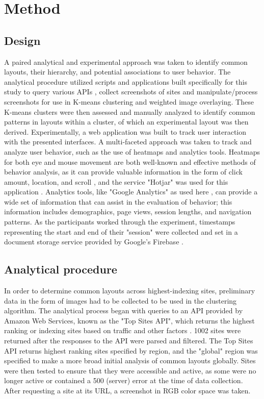 \documentclass[conference]{IEEEtran}
\begin{document}
\section{Method}

\subsection{Design}

A paired analytical and experimental approach was taken to identify common layouts, their hierarchy, and potential associations to user behavior. The analytical procedure utilized scripts and applications \cite{sorin_2020} built specifically for this study to query various APIs \cite{antoniou_2015, deepai}, collect screenshots of sites and manipulate/process screenshots for use in K-means clustering and weighted image overlaying. These K-means clusters were then assessed and manually analyzed to identify common patterns in layouts within a cluster, of which an experimental layout was then derived. Experimentally, a web application was built \cite{sorin} to track user interaction with the presented interfaces. A multi-faceted approach was taken to track and analyze user behavior, such as the use of heatmaps and analytics tools. Heatmaps for both eye and mouse movement are both well-known and effective methods of behavior analysis, as it can provide valuable information in the form of click amount, location, and scroll \cite{mousetracking}, and the service "Hotjar" was used for this application \cite{hotjar}. Analytics tools, like "Google Analytics" as used here \cite{google_analytics}, can provide a wide set of information that can assist in the evaluation of behavior; this information includes demographics, page views, session lengths, and navigation patterns. As the participants worked through the experiment, timestamps representing the start and end of their "session" were collected and set in a document storage service provided by Google's Firebase \cite{google_firebase}.

\subsection{Analytical procedure}

In order to determine common layouts across highest-indexing sites, preliminary data in the form of images had to be collected to be used in the clustering algorithm. The analytical process began with queries to an API provided by Amazon Web Services, known as the "Top Sites API", which returns the highest ranking or indexing sites based on traffic and other factors \cite{antoniou_2015}. 1002 sites were returned after the responses to the API were parsed and filtered. The Top Sites API returns highest ranking sites specified by region, and the "global" region was specified to make a more broad initial analysis of common layouts globally. Sites were then tested to ensure that they were accessible and active, as some were no longer active or contained a 500 (server) error at the time of data collection. After requesting a site at its URL, a screenshot in RGB color space was taken.
\end{document}
